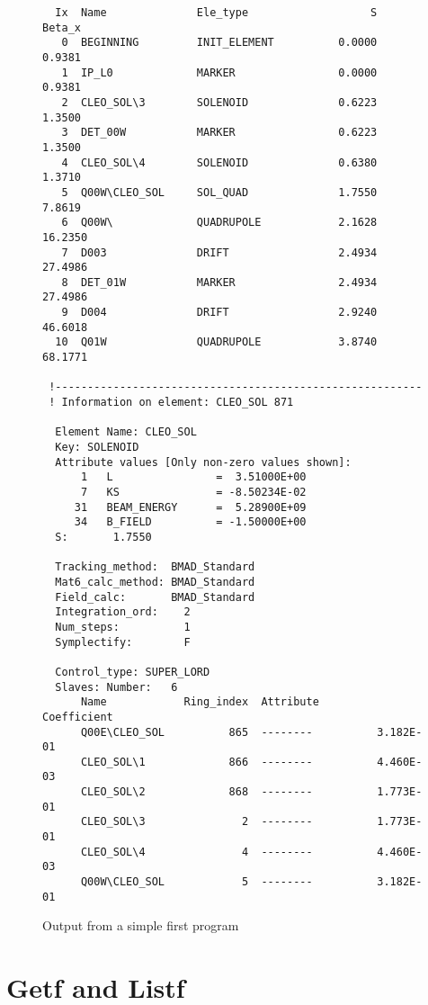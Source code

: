 \begin{figure}
\begin{verbatim}
  Ix  Name              Ele_type                   S      Beta_x
   0  BEGINNING         INIT_ELEMENT          0.0000      0.9381
   1  IP_L0             MARKER                0.0000      0.9381
   2  CLEO_SOL\3        SOLENOID              0.6223      1.3500
   3  DET_00W           MARKER                0.6223      1.3500
   4  CLEO_SOL\4        SOLENOID              0.6380      1.3710
   5  Q00W\CLEO_SOL     SOL_QUAD              1.7550      7.8619
   6  Q00W\             QUADRUPOLE            2.1628     16.2350
   7  D003              DRIFT                 2.4934     27.4986
   8  DET_01W           MARKER                2.4934     27.4986
   9  D004              DRIFT                 2.9240     46.6018
  10  Q01W              QUADRUPOLE            3.8740     68.1771

 !---------------------------------------------------------
 ! Information on element: CLEO_SOL 871

  Element Name: CLEO_SOL
  Key: SOLENOID
  Attribute values [Only non-zero values shown]:
      1   L                =  3.51000E+00
      7   KS               = -8.50234E-02
     31   BEAM_ENERGY      =  5.28900E+09
     34   B_FIELD          = -1.50000E+00
  S:       1.7550

  Tracking_method:  BMAD_Standard
  Mat6_calc_method: BMAD_Standard
  Field_calc:       BMAD_Standard
  Integration_ord:    2
  Num_steps:          1
  Symplectify:        F

  Control_type: SUPER_LORD
  Slaves: Number:   6
      Name            Ring_index  Attribute       Coefficient
      Q00E\CLEO_SOL          865  --------          3.182E-01
      CLEO_SOL\1             866  --------          4.460E-03
      CLEO_SOL\2             868  --------          1.773E-01
      CLEO_SOL\3               2  --------          1.773E-01
      CLEO_SOL\4               4  --------          4.460E-03
      Q00W\CLEO_SOL            5  --------          3.182E-01
\end{verbatim}
\caption{Output from a simple first program}
\label{f:output}
\end{figure}

\section{Getf and Listf}
\label{s:getf}

